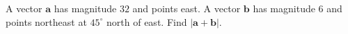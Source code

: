 A vector $\mathbf a$ has magnitude $32$ and points east. A vector $\mathbf b$ has magnitude $6$ and points northeast at $45^\circ$ north of east. Find $|\mathbf a+\mathbf b|$.
